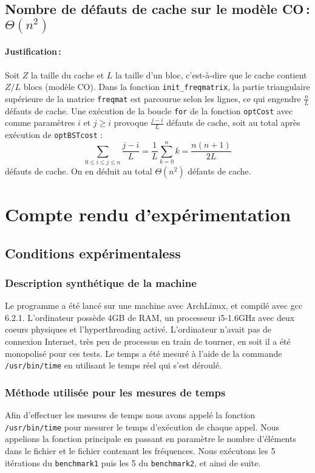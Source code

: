 \documentclass[a4paper,10pt,french]{article}
\newcommand{\dsp}{\displaystyle}
\begin{document}
\subsection{Nombre de défauts de cache sur le modèle CO\,: $\Theta(n^2)$}
\paragraph{Justification\,: }
Soit $Z$ la taille du cache et $L$ la taille d'un bloc, c'est-à-dire que le cache contient $Z/L$ blocs (modèle CO).
Dans la fonction \texttt{init\_freqmatrix}, la partie triangulaire supérieure de la matrice \texttt{freqmat} est parcourue selon les lignes, ce qui engendre $\dsp\frac{n}{L}$ défauts de cache.
Une exécution de la boucle \texttt{for} de la fonction \texttt{optCost} avec comme paramètres $i$ et $j\geq i$ provoque $\dsp\frac{j-i}{L}$ défauts de cache, soit au total après exécution de \texttt{optBSTcost} : $$\sum_{0\leq i\leq j\leq n}\frac{j-i}{L}=\frac{1}{L}\sum_{k=0}^n k=\frac{n(n+1)}{2L}$$ défauts de cache. On en déduit au total $\Theta(n^2)$ défauts de cache.

\section{Compte rendu d'expérimentation}
\subsection{Conditions expérimentaless}

\subsubsection{Description synthétique de la machine}
Le programme a été lancé sur une machine avec ArchLinux, et compilé avec gcc 6.2.1.
L'ordinateur possède 4GB de RAM, un processeur i5-1.6GHz avec deux coeurs physiques et l'hyperthreading activé.
L'ordinateur n'avait pas de connexion Internet, très peu de processus en train de tourner, en soit il a été
monopolisé pour ces tests.
Le temps a été mesuré à l'aide de la commande \texttt{/usr/bin/time} en utilisant le temps réel qui s'est déroulé.

\subsubsection{Méthode utilisée pour les mesures de temps}
Afin d'effectuer les mesures de temps nous avons appelé la fonction \texttt{/usr/bin/time} pour mesurer le temps d'exécution
de chaque appel. Nous appelions la fonction principale en passant en paramètre le nombre d'éléments dans le fichier
et le fichier contenant les fréquences. Nous exécutons les 5 itérations du \texttt{benchmark1} puis les 5 du \texttt{benchmark2}, et ainsi de suite.
\end{document}
